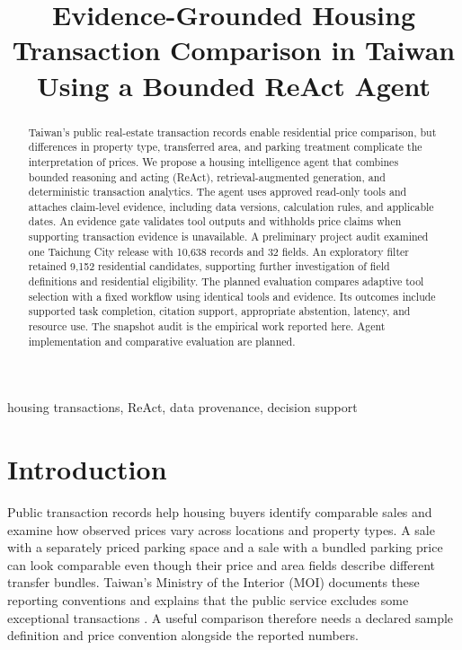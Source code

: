 \documentclass[conference]{IEEEtran}
\title{Evidence-Grounded Housing Transaction Comparison in Taiwan Using a Bounded ReAct Agent}
\author{\IEEEauthorblockN{Author information pending}
\IEEEauthorblockA{National Chung Hsing University\\Taichung, Taiwan}}
\begin{document}
\maketitle

\begin{abstract}
Taiwan's public real-estate transaction records enable residential price comparison, but differences in property type, transferred area, and parking treatment complicate the interpretation of prices. We propose a housing intelligence agent that combines bounded reasoning and acting (ReAct), retrieval-augmented generation, and deterministic transaction analytics. The agent uses approved read-only tools and attaches claim-level evidence, including data versions, calculation rules, and applicable dates. An evidence gate validates tool outputs and withholds price claims when supporting transaction evidence is unavailable. A preliminary project audit examined one Taichung City release with 10,638 records and 32 fields. An exploratory filter retained 9,152 residential candidates, supporting further investigation of field definitions and residential eligibility. The planned evaluation compares adaptive tool selection with a fixed workflow using identical tools and evidence. Its outcomes include supported task completion, citation support, appropriate abstention, latency, and resource use. The snapshot audit is the empirical work reported here. Agent implementation and comparative evaluation are planned.
\end{abstract}

\begin{IEEEkeywords}
housing transactions, ReAct, data provenance, decision support
\end{IEEEkeywords}

\section{Introduction}
Public transaction records help housing buyers identify comparable sales and examine how observed prices vary across locations and property types. A sale with a separately priced parking space and a sale with a bundled parking price can look comparable even though their price and area fields describe different transfer bundles. Taiwan's Ministry of the Interior (MOI) documents these reporting conventions and explains that the public service excludes some exceptional transactions \cite{moi}. A useful comparison therefore needs a declared sample definition and price convention alongside the reported numbers.
\end{document}
